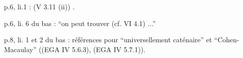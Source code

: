 p.6, li.1 : (V 3.11 (ii)) .

p.6, li. 6 du bas : ``on peut trouver (cf. VI 4.1) ...''

p.8, li. 1 et 2 du bas : références pour ``universellement caténaire'' et ``Cohen-Macaulay'' ((EGA IV 5.6.3), (EGA IV 5.7.1)). 

